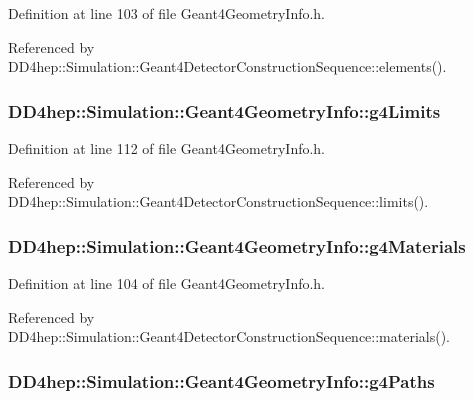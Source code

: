 Definition at line 103 of file Geant4GeometryInfo.h.

Referenced by DD4hep::Simulation::Geant4DetectorConstructionSequence::elements().\hypertarget{class_d_d4hep_1_1_simulation_1_1_geant4_geometry_info_a6005f56c4ca13d015288ae645e58df69}{
\subsubsection[{g4Limits}]{ {\bf DD4hep::Simulation::Geant4GeometryInfo::g4Limits}}}
\label{class_d_d4hep_1_1_simulation_1_1_geant4_geometry_info_a6005f56c4ca13d015288ae645e58df69}


Definition at line 112 of file Geant4GeometryInfo.h.

Referenced by DD4hep::Simulation::Geant4DetectorConstructionSequence::limits().\hypertarget{class_d_d4hep_1_1_simulation_1_1_geant4_geometry_info_a371057dc8aa3117cc3dfc465fd692cfb}{
\subsubsection[{g4Materials}]{ {\bf DD4hep::Simulation::Geant4GeometryInfo::g4Materials}}}
\label{class_d_d4hep_1_1_simulation_1_1_geant4_geometry_info_a371057dc8aa3117cc3dfc465fd692cfb}


Definition at line 104 of file Geant4GeometryInfo.h.

Referenced by DD4hep::Simulation::Geant4DetectorConstructionSequence::materials().\hypertarget{class_d_d4hep_1_1_simulation_1_1_geant4_geometry_info_a526d06afb77ac403965f2bb6c55998de}{
\subsubsection[{g4Paths}]{ {\bf DD4hep::Simulation::Geant4GeometryInfo::g4Paths}}}
\label{class_d_d4hep_1_1_simulation_1_1_geant4_geometry_info_a526d06afb77ac403965f2bb6c55998de}


